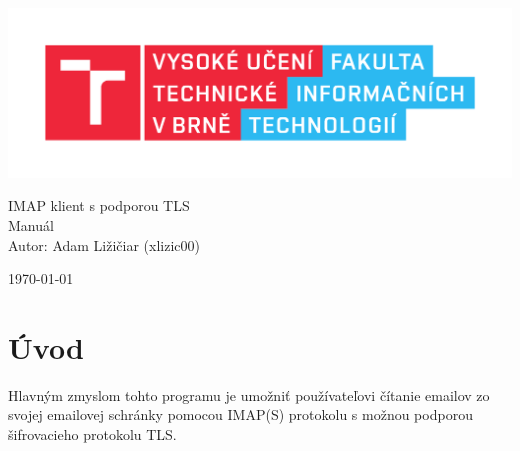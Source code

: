 \documentclass[a4paper, 11pt]{article}
\begin{document}
	\begin{titlepage}
		\begin{center}
			\includegraphics[width=0.77\linewidth]{res/logo_FIT.pdf} \\


			\Huge{IMAP klient s podporou TLS} \\
			\LARGE{Manuál} \\
			\Large{Autor: Adam Ližičiar (xlizic00)}
		\end{center}

		\begin{minipage}{0.4 \textwidth}
			{\Large \today}
		\end{minipage}
		\hfill
	\end{titlepage}



	\setcounter{page}{1}
	\tableofcontents
	\clearpage



	\setcounter{page}{1}


	\section{Úvod}
	Hlavným zmyslom tohto programu je umožniť používateľovi čítanie emailov zo svojej emailovej schránky pomocou IMAP(S) protokolu s možnou podporou šifrovacieho protokolu TLS.\newline

\end{document}
